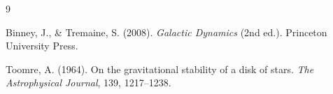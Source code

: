 \documentclass[12pt, letterpaper]{article}
\begin{document}

\begin{thebibliography}{9}

Binney, J., \& Tremaine, S. (2008).
\newblock \textit{Galactic Dynamics} (2nd ed.).
\newblock Princeton University Press.

Toomre, A. (1964).
\newblock On the gravitational stability of a disk of stars.
\newblock \textit{The Astrophysical Journal}, 139, 1217--1238.

\end{thebibliography}
\end{document}
